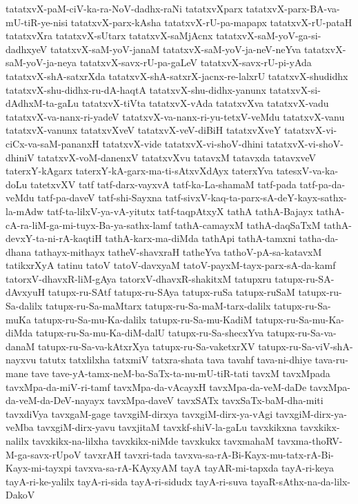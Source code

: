 {tatatxvX-paM-ciV-ka-ra-NoV-dadhx-raNi
tatatxvXparx
tatatxvX-parx-BA-va-mU-tiR-ye-nisi
tatatxvX-parx-kAsha
tatatxvX-rU-pa-mapapx
tatatxvX-rU-pataH
tatatxvXra
tatatxvX-sUtarx
tatatxvX-saMjAcnx
tatatxvX-saM-yoV-ga-si-dadhxyeV
tatatxvX-saM-yoV-janaM
tatatxvX-saM-yoV-ja-neV-neYva
tatatxvX-saM-yoV-ja-neya
tatatxvX-savx-rU-pa-gaLeV
tatatxvX-savx-rU-pi-yAda
tatatxvX-shA-satxrXda
tatatxvX-shA-satxrX-jacnx-re-lalxrU
tatatxvX-shudidhx
tatatxvX-shu-didhx-ru-dA-haqtA
tatatxvX-shu-didhx-yanunx
tatatxvX-si-dAdhxM-ta-gaLu
tatatxvX-tiVta
tatatxvX-vAda
tatatxvXva
tatatxvX-vadu
tatatxvX-va-nanx-ri-yadeV
tatatxvX-va-nanx-ri-yu-tetxV-veMdu
tatatxvX-vanu
tatatxvX-vanunx
tatatxvXveV
tatatxvX-veV-diBiH
tatatxvXveY
tatatxvX-vi-ciCx-va-saM-pananxH
tatatxvX-vide
tatatxvX-vi-shoV-dhini
tatatxvX-vi-shoV-dhiniV
tatatxvX-voM-danenxV
tatatxvXvu
tatavxM
tatavxda
tatavxveV
taterxY-kAgarx
taterxY-kA-garx-ma-ti-sAtxvXdAyx
taterxYva
tatesxV-va-ka-doLu
tatetxvXV
tatf
tatf-darx-vayxvA
tatf-ka-La-shamaM
tatf-pada
tatf-pa-da-veMdu
tatf-pa-daveV
tatf-shi-Sayxna
tatf-sivxV-kaq-ta-parx-sA-deY-kayx-sathx-la-mAdw
tatf-ta-lilxV-ya-vA-yitutx
tatf-taqpAtxyX
tathA
tathA-Bajayx
tathA-cA-ra-liM-ga-mi-tuyx-Ba-ya-sathx-lamf
tathA-camayxM
tathA-daqSaTxM
tathA-devxY-ta-ni-rA-kaqtiH
tathA-karx-ma-diMda
tathApi
tathA-tamxni
tatha-da-dhana
tathayx-mithayx
tatheV-shavxraH
tatheYva
tathoV-pA-sa-katavxM
tatikxrXyA
tatinu
tatoV
tatoV-davxyaM
tatoV-payxM-tayx-parx-sA-da-kamf
tatorxV-dhavxR-liM-gAya
tatorxV-dhavxR-shakitxM
tatupxru
tatupx-ru-SA-dAvxyuH
tatupx-ru-SAtf
tatupx-ru-SAya
tatupx-ruSa
tatupx-ruSaM
tatupx-ru-Sa-dalilx
tatupx-ru-Sa-maMtarx
tatupx-ru-Sa-maM-tarx-dalilx
tatupx-ru-Sa-muKa
tatupx-ru-Sa-mu-Ka-dalilx
tatupx-ru-Sa-mu-KadiM
tatupx-ru-Sa-mu-Ka-diMda
tatupx-ru-Sa-mu-Ka-diM-dalU
tatupx-ru-Sa-shecxYva
tatupx-ru-Sa-va-danaM
tatupx-ru-Sa-va-kAtxrXya
tatupx-ru-Sa-vaketxrXV
tatupx-ru-Sa-viV-shA-nayxvu
tatutx
tatxlilxha
tatxmiV
tatxra-shata
tava
tavahf
tava-ni-dhiye
tava-ru-mane
tave
tave-yA-tamx-neM-ba-SaTx-ta-nu-mU-tiR-tati
tavxM
tavxMpada
tavxMpa-da-miV-ri-tamf
tavxMpa-da-vAcayxH
tavxMpa-da-veM-daDe
tavxMpa-da-veM-da-DeV-nayayx
tavxMpa-daveV
tavxSATx
tavxSaTx-baM-dha-miti
tavxdiVya
tavxgaM-gage
tavxgiM-dirxya
tavxgiM-dirx-ya-vAgi
tavxgiM-dirx-ya-veMba
tavxgiM-dirx-yavu
tavxjitaM
tavxkf-shiV-la-gaLu
tavxkikxna
tavxkikx-nalilx
tavxkikx-na-lilxha
tavxkikx-niMde
tavxkukx
tavxmahaM
tavxma-thoRV-M-ga-savx-rUpoV
tavxrAH
tavxri-tada
tavxva-sa-rA-Bi-Kayx-mu-tatx-rA-Bi-Kayx-mi-tayxpi
tavxva-sa-rA-KAyxyAM
tayA
tayAR-mi-tapxda
tayA-ri-keya
tayA-ri-ke-yalilx
tayA-ri-sida
tayA-ri-sidudx
tayA-ri-suva
tayaR-sAthx-na-da-lilx-DakoV
}

